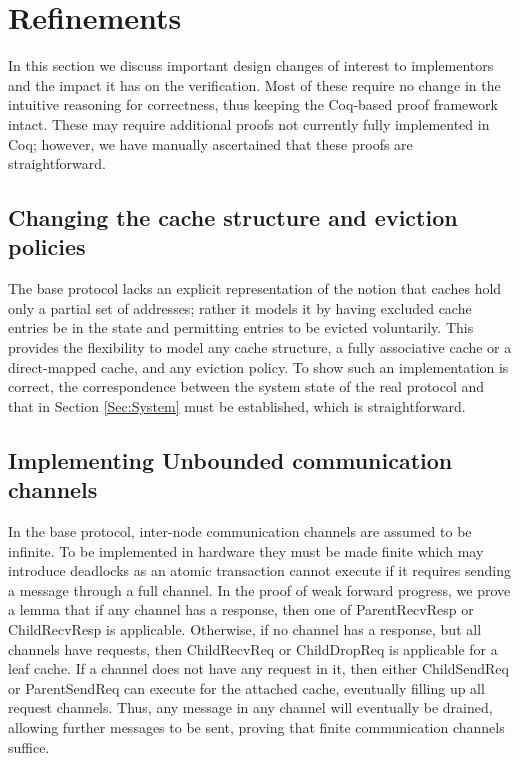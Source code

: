 \section{Refinements}
\label{Sec:Refinements}

In this section we discuss important design changes of interest to
implementors and the impact it has on the verification. Most of these
require no change in the intuitive reasoning for correctness, thus
keeping the Coq-based proof framework intact. These may require
additional proofs not currently fully implemented in Coq; however, we
have manually ascertained that these proofs are straightforward.



\subsection{Changing the cache structure and eviction policies}

The base protocol lacks an explicit representation of the notion that
caches hold only a partial set of addresses; rather it models it by
having excluded cache entries be in the \In{} state and permitting
entries to be evicted voluntarily. This provides the flexibility to
model any cache structure, \eg{} a fully associative cache or a
direct-mapped cache, and any eviction policy. To show such an
implementation is correct, the correspondence
between the system state of the real protocol and that in Section
\ref{Sec:System} must be established, which is straightforward.


\subsection{Implementing Unbounded communication channels}

In the base protocol, inter-node communication channels are assumed to
be infinite. To be implemented in hardware they must be made finite
which may introduce deadlocks as an atomic transaction cannot execute
if it requires sending a message through a full channel. In the proof
of weak forward progress, we prove a lemma that if any channel has a
response, then one of ParentRecvResp or ChildRecvResp is
applicable. Otherwise, if no channel has a response, but all channels
have requests, then ChildRecvReq or ChildDropReq is applicable for a
leaf cache. If a channel does not have any request in it, then either
ChildSendReq or ParentSendReq can execute for the attached cache,
eventually filling up all request channels.  Thus, any message in any
channel will eventually be drained, allowing further messages to be
sent, proving that finite communication channels suffice.

